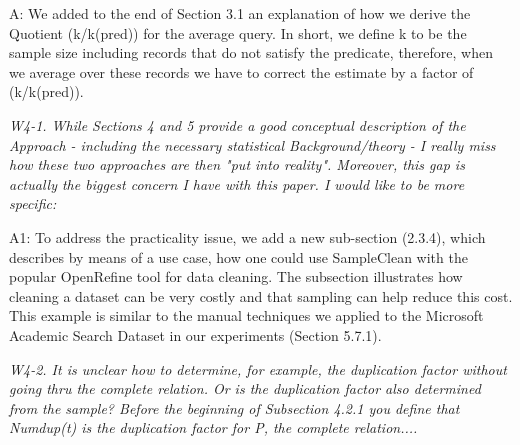 A: %
We added to the end of Section 3.1 an explanation of how we derive the Quotient (k/k(pred)) for the average query.
In short, we define k to be the sample size including records that do not satisfy the predicate, therefore, when we average over these records we have to correct the estimate by a factor of (k/k(pred)). 


\mbox{}

\emph{W4-1. While Sections 4 and 5 provide a good conceptual description of the Approach - including the necessary statistical Background/theory - I really miss how these two approaches are then "put into reality". Moreover, this gap is actually the biggest concern I have with this paper. I would like to be more specific:}

A1: 
%
To address the practicality issue, we add a new sub-section (2.3.4), which describes by means of a use case, how one could use SampleClean with the popular OpenRefine tool for data cleaning. The subsection illustrates how cleaning a dataset can be very costly and that sampling can help reduce this cost. 
This example is similar to the manual techniques we applied to the Microsoft Academic Search Dataset in our experiments (Section 5.7.1).
\vspace{1em}

\emph{W4-2. It is unclear how to determine, for example, the duplication factor without going thru the complete relation. Or is the duplication factor also determined from the sample? Before the beginning of Subsection 4.2.1 you define that Numdup(t) is the duplication factor for P, the complete relation.... }

